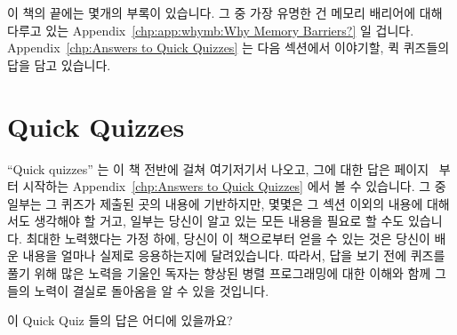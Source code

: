 이 책의 끝에는 몇개의 부록이 있습니다.  그 중 가장 유명한 건 메모리 배리어에
대해 다루고 있는 Appendix~\ref{chp:app:whymb:Why Memory Barriers?} 일 겁니다.
Appendix~\ref{chp:Answers to Quick Quizzes} 는 다음 섹션에서 이야기할, 퀵
퀴즈들의 답을 담고 있습니다.


\section{Quick Quizzes}
\label{sec:howto:Quick Quizzes}

``Quick quizzes'' 는 이 책 전반에 걸쳐 여기저기서 나오고, 그에 대한 답은
페이지~\pageref{chp:Answers to Quick Quizzes} 부터 시작하는
Appendix~\ref{chp:Answers to Quick Quizzes} 에서 볼 수 있습니다.
그 중 일부는 그 퀴즈가 제출된 곳의 내용에 기반하지만, 몇몇은 그 섹션 이외의
내용에 대해서도 생각해야 할 거고, 일부는 당신이 알고 있는 모든 내용을 필요로 할
수도 있습니다.
최대한 노력했다는 가정 하에, 당신이 이 책으로부터 얻을 수 있는 것은 당신이 배운
내용을 얼마나 실제로 응용하는지에 달려있습니다.  따라서, 답을 보기 전에 퀴즈를
풀기 위해 많은 노력을 기울인 독자는 향상된 병렬 프로그래밍에 대한 이해와 함께
그들의 노력이 결실로 돌아옴을 알 수 있을 것입니다.


\QuickQuiz{}
	이 Quick Quiz 들의 답은 어디에 있을까요?

 \QuickQuizEnd

